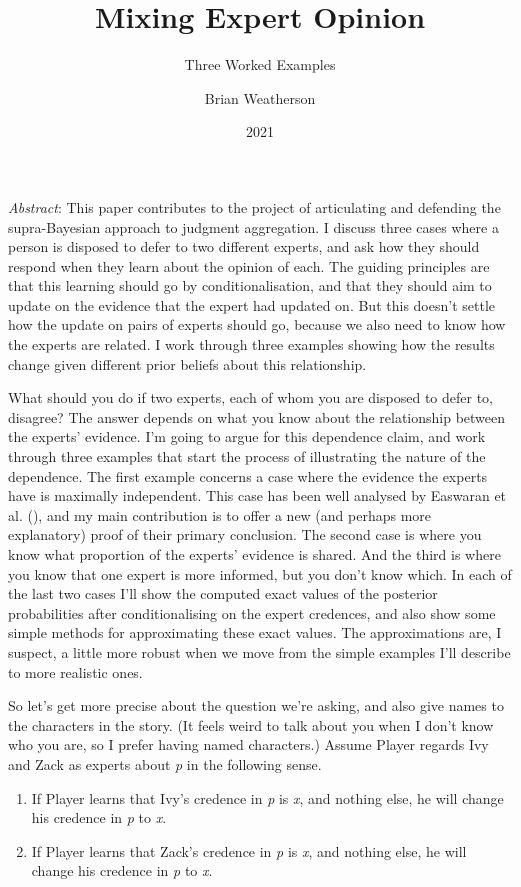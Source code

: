 \documentclass[
  11pt,
  letterpaper,
  DIV=11,
  numbers=noendperiod,
  twoside]{scrartcl}
\title{Mixing Expert Opinion}
\subtitle{Three Worked Examples}
\author{Brian Weatherson}
\date{2021}
\renewenvironment{abstract}
 {\vspace{-1.25cm}
 \quotation\small\noindent\emph{Abstract}:}
 {\endquotation}
\begin{document}
\maketitle
\begin{abstract}
This paper contributes to the project of articulating and defending the
supra-Bayesian approach to judgment aggregation. I discuss three cases
where a person is disposed to defer to two different experts, and ask
how they should respond when they learn about the opinion of each. The
guiding principles are that this learning should go by
conditionalisation, and that they should aim to update on the evidence
that the expert had updated on. But this doesn't settle how the update
on pairs of experts should go, because we also need to know how the
experts are related. I work through three examples showing how the
results change given different prior beliefs about this relationship.
\end{abstract}


What should you do if two experts, each of whom you are disposed to
defer to, disagree? The answer depends on what you know about the
relationship between the experts' evidence. I'm going to argue for this
dependence claim, and work through three examples that start the process
of illustrating the nature of the dependence. The first example concerns
a case where the evidence the experts have is maximally independent.
This case has been well analysed by Easwaran et al.
(), and my main contribution is to
offer a new (and perhaps more explanatory) proof of their primary
conclusion. The second case is where you know what proportion of the
experts' evidence is shared. And the third is where you know that one
expert is more informed, but you don't know which. In each of the last
two cases I'll show the computed exact values of the posterior
probabilities after conditionalising on the expert credences, and also
show some simple methods for approximating these exact values. The
approximations are, I suspect, a little more robust when we move from
the simple examples I'll describe to more realistic ones.

So let's get more precise about the question we're asking, and also give
names to the characters in the story. (It feels weird to talk about you
when I don't know who you are, so I prefer having named characters.)
Assume Player regards Ivy and Zack as experts about \emph{p} in the
following sense.

\begin{enumerate}
\def\labelenumi{(\arabic{enumi})}
\item
  If Player learns that Ivy's credence in \emph{p} is \emph{x}, and
  nothing else, he will change his credence in \emph{p} to \emph{x}.
\item
  If Player learns that Zack's credence in \emph{p} is \emph{x}, and
  nothing else, he will change his credence in \emph{p} to \emph{x}.
\end{enumerate}
\end{document}
